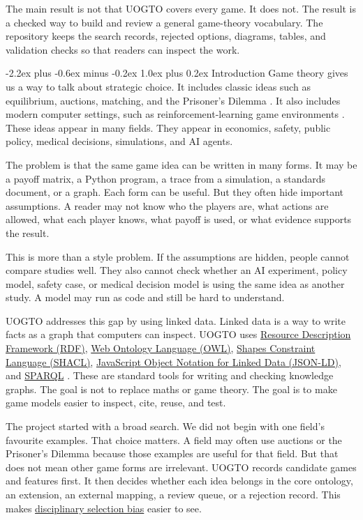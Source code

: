 \documentclass[11pt]{article}
\makeatletter
\renewcommand\section{\@startsection{section}{1}{\z@}%
  {-2.2ex plus -0.6ex minus -0.2ex}%
  {1.0ex plus 0.2ex}%
  {\normalfont\Large\bfseries\color{uogtoInk}}}
\newcommand{\glslink}[2]{\hyperlink{gloss:#1}{#2}}
\newcommand{\abblink}[2]{\hyperlink{abbr:#1}{#2}}
\makeatother
\begin{document}
The main result is not that UOGTO covers every game. It does not. The result is a checked way to build and review a general game-theory vocabulary. The repository keeps the search records, rejected options, diagrams, tables, and validation checks so that readers can inspect the work.

\section{Introduction}
Game theory gives us a way to talk about strategic choice. It includes classic ideas such as equilibrium, auctions, matching, and the Prisoner's Dilemma \cite{nash-1950,harsanyi-1967,shapley-1953,vickrey-1961,myerson-1981,gale-shapley-1962,rapoport-chammah-1965}. It also includes modern computer settings, such as reinforcement-learning game environments \cite{nisan-2007,open-spiel-2019,arxiv-2006-06580v3}. These ideas appear in many fields. They appear in economics, safety, public policy, medical decisions, simulations, and AI agents.

The problem is that the same game idea can be written in many forms. It may be a payoff matrix, a Python program, a trace from a simulation, a standards document, or a graph. Each form can be useful. But they often hide important assumptions. A reader may not know who the players are, what actions are allowed, what each player knows, what payoff is used, or what evidence supports the result.

This is more than a style problem. If the assumptions are hidden, people cannot compare studies well. They also cannot check whether an AI experiment, policy model, safety case, or medical decision model is using the same idea as another study. A model may run as code and still be hard to understand.

UOGTO addresses this gap by using linked data. Linked data is a way to write facts as a graph that computers can inspect. UOGTO uses \abblink{rdf}{Resource Description Framework (RDF)}, \abblink{owl}{Web Ontology Language (OWL)}, \abblink{shacl}{Shapes Constraint Language (SHACL)}, \abblink{jsonld}{JavaScript Object Notation for Linked Data (JSON-LD)}, and \abblink{sparql}{SPARQL} \cite{gruber-1995,w3c-rdf11-concepts,w3c-owl2-overview,w3c-shacl,w3c-json-ld11,w3c-sparql11-query}. These are standard tools for writing and checking knowledge graphs. The goal is not to replace maths or game theory. The goal is to make game models easier to inspect, cite, reuse, and test.

The project started with a broad search. We did not begin with one field's favourite examples. That choice matters. A field may often use auctions or the Prisoner's Dilemma because those examples are useful for that field. But that does not mean other game forms are irrelevant. UOGTO records candidate games and features first. It then decides whether each idea belongs in the core ontology, an extension, an external mapping, a review queue, or a rejection record. This makes \glslink{disciplinary-selection-bias}{disciplinary selection bias} easier to see.
\end{document}
